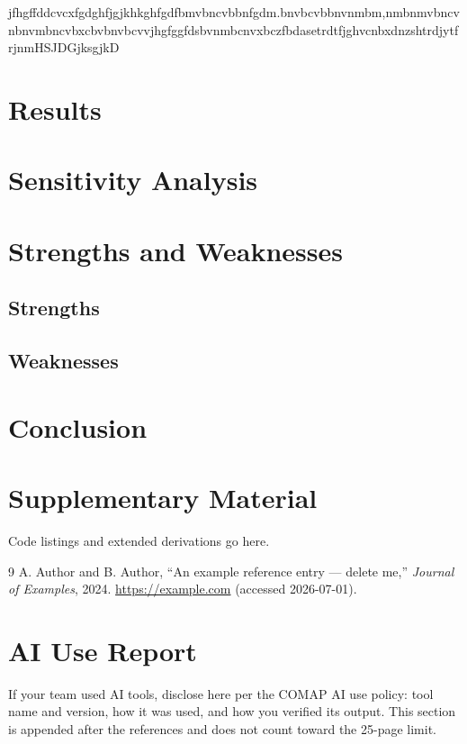 \documentclass[12pt,letterpaper]{article}
\begin{document}
jfhgffddcvcxfgdghfjgjkhkghfgdfbmvbncvbbnfgdm.bnvbcvbbnvnmbm,nmbnmvbncvnbnvmbncvbxcbvbnvbcvvjhgfggfdsbvnmbcnvxbczfbdasetrdtfjghvcnbxdnzshtrdjytfrjnmHSJDGjksgjkD

\section{Results}

\section{Sensitivity Analysis}

\section{Strengths and Weaknesses}

\subsection{Strengths}

\subsection{Weaknesses}

\section{Conclusion}

\appendix

\section{Supplementary Material}

Code listings and extended derivations go here.

\begin{thebibliography}{9}
 A. Author and B. Author, ``An example reference entry — delete me,'' \textit{Journal of Examples}, 2024. \url{https://example.com} (accessed 2026-07-01).
\end{thebibliography}

\newpage
\section*{AI Use Report}\label{sec:aireport}

If your team used AI tools, disclose here per the COMAP AI use policy: tool name and version, how it was used, and how you verified its output. This section is appended after the references and does not count toward the 25-page limit.
\end{document}
